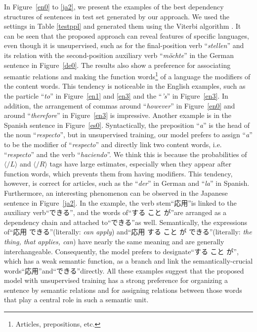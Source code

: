 \documentclass[english]{jnlp_1.4}
\begin{document}
In Figure~\ref{en0} to \ref{ja2}, we present the examples of the best dependency structures of sentences in test set generated by our approach. We used the settings in Table \ref{testppl} and generated them using the Viterbi algorithm \cite{viterbi1967error}. It can be seen that the proposed approach can reveal features of specific languages, even though it is unsupervised, such as for the final-position verb ``{\it{stellen}}'' and its relation with the second-position auxiliary verb  ``{\it{m\"{o}chte}}'' in the German sentence in Figure~\ref{de0}. The results also show a preference for associating semantic relations and making the function words\footnote{Articles, prepositions, etc.} of a language the modifiers of the content words. 
This tendency is noticeable in the English examples, such as the particle ``{\it{to}}'' in Figure~\ref{en1} and \ref{en3} and the ``{\it{'s}}'' in Figure~\ref{en3}. In addition, the arrangement of commas around ``{\it{however}}'' in Figure~\ref{en0} and around ``{\it{therefore}}'' in Figure~\ref{en3} is impressive.
Another example is in the Spanish sentence in Figure~\ref{es0}. Syntactically, the preposition ``{\it{a}}'' is the head of the noun ``{\it{respecto}}'', but in unsupervised training, our model prefers to assign ``{\it{a}}'' to be the modifier of ``{\it{respecto}}'' and directly link two content words, i.e. ``{\it{respecto}}'' and the verb ``{\it{haciendo}}''. We think this is because the probabilities of $\langle \slash L \rangle$ and \mbox{$\langle \slash R \rangle$} tags have large estimates, especially when they appear after function words, which prevents them from having modifiers. This tendency, however, is correct for articles, such as the ``{\it{der}}'' in German and ``{\it{la}}'' in Spanish. Furthermore, an interesting phenomenon can be observed in the Japanese sentence in Figure~\ref{ja2}. In the example, the verb stem“応用”is linked to the auxiliary verb“できる”, and the words of“する こと が”are arranged as a dependency chain and attached to“できる”as well. Semantically, the expressions of“応用 できる”(literally: {\it can apply}) and“応用 する こと が できる”(literally: {\it the thing, that applies, can}) have nearly the same meaning and are generally interchangeable. Consequently, the model prefers to designate“する こと が”, which has a weak semantic function, as a branch and link the semantically-crucial words“応用”and“できる”directly. All these examples suggest that the proposed model with unsupervised training has a strong preference for organizing a sentence by semantic relations and for assigning relations between those words that play a central role in such a semantic unit.
\end{document}
